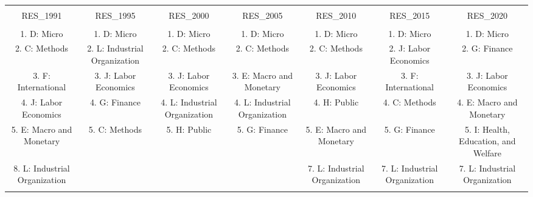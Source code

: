 
\begin{table}[!htbp] \centering 
  \caption{} 
  \label{} 
\scriptsize 
\begin{tabular}{@{\extracolsep{5pt}} ccccccc} 
\\[-1.8ex]\hline 
\hline \\[-1.8ex] 
RES\_1991 & RES\_1995 & RES\_2000 & RES\_2005 & RES\_2010 & RES\_2015 & RES\_2020 \\ 
\hline \\[-1.8ex] 
1. D: Micro & 1. D: Micro & 1. D: Micro & 1. D: Micro & 1. D: Micro & 1. D: Micro & 1. D: Micro \\ 
2. C: Methods & 2. L: Industrial Organization & 2. C: Methods & 2. C: Methods & 2. C: Methods & 2. J: Labor Economics & 2. G: Finance \\ 
3. F: International & 3. J: Labor Economics & 3. J: Labor Economics & 3. E: Macro and Monetary & 3. J: Labor Economics & 3. F: International & 3. J: Labor Economics \\ 
4. J: Labor Economics & 4. G: Finance & 4. L: Industrial Organization & 4. L: Industrial Organization & 4. H: Public & 4. C: Methods & 4. E: Macro and Monetary \\ 
5. E: Macro and Monetary & 5. C: Methods & 5. H: Public & 5. G: Finance & 5. E: Macro and Monetary & 5. G: Finance & 5. I: Health, Education, and Welfare \\ 
8. L: Industrial Organization &  &  &  & 7. L: Industrial Organization & 7. L: Industrial Organization & 7. L: Industrial Organization \\ 
\hline \\[-1.8ex] 
\end{tabular} 
\end{table} 
